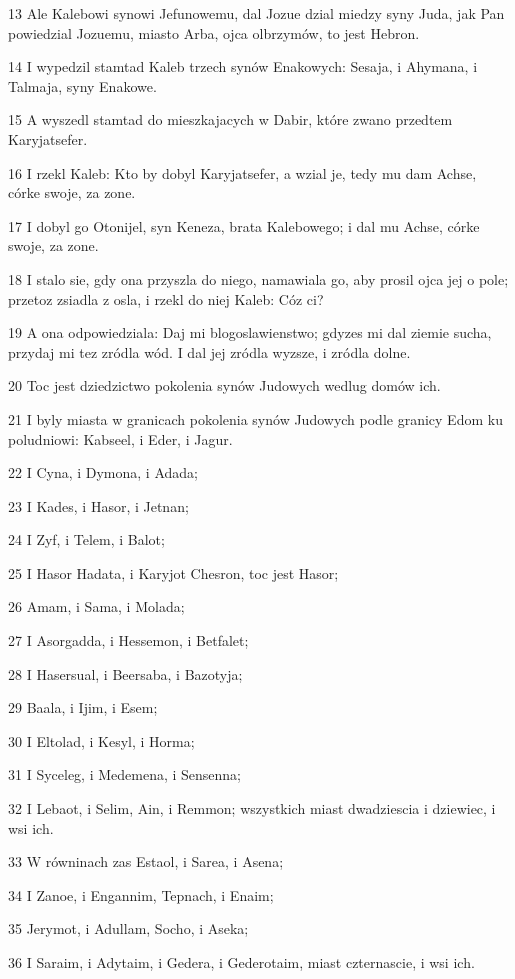 \par 13 Ale Kalebowi synowi Jefunowemu, dal Jozue dzial miedzy syny Juda, jak Pan powiedzial Jozuemu, miasto Arba, ojca olbrzymów, to jest Hebron.
\par 14 I wypedzil stamtad Kaleb trzech synów Enakowych: Sesaja, i Ahymana, i Talmaja, syny Enakowe.
\par 15 A wyszedl stamtad do mieszkajacych w Dabir, które zwano przedtem Karyjatsefer.
\par 16 I rzekl Kaleb: Kto by dobyl Karyjatsefer, a wzial je, tedy mu dam Achse, córke swoje, za zone.
\par 17 I dobyl go Otonijel, syn Keneza, brata Kalebowego; i dal mu Achse, córke swoje, za zone.
\par 18 I stalo sie, gdy ona przyszla do niego, namawiala go, aby prosil ojca jej o pole; przetoz zsiadla z osla, i rzekl do niej Kaleb: Cóz ci?
\par 19 A ona odpowiedziala: Daj mi blogoslawienstwo; gdyzes mi dal ziemie sucha, przydaj mi tez zródla wód. I dal jej zródla wyzsze, i zródla dolne.
\par 20 Toc jest dziedzictwo pokolenia synów Judowych wedlug domów ich.
\par 21 I byly miasta w granicach pokolenia synów Judowych podle granicy Edom ku poludniowi: Kabseel, i Eder, i Jagur.
\par 22 I Cyna, i Dymona, i Adada;
\par 23 I Kades, i Hasor, i Jetnan;
\par 24 I Zyf, i Telem, i Balot;
\par 25 I Hasor Hadata, i Karyjot Chesron, toc jest Hasor;
\par 26 Amam, i Sama, i Molada;
\par 27 I Asorgadda, i Hessemon, i Betfalet;
\par 28 I Hasersual, i Beersaba, i Bazotyja;
\par 29 Baala, i Ijim, i Esem;
\par 30 I Eltolad, i Kesyl, i Horma;
\par 31 I Syceleg, i Medemena, i Sensenna;
\par 32 I Lebaot, i Selim, Ain, i Remmon; wszystkich miast dwadziescia i dziewiec, i wsi ich.
\par 33 W równinach zas Estaol, i Sarea, i Asena;
\par 34 I Zanoe, i Engannim, Tepnach, i Enaim;
\par 35 Jerymot, i Adullam, Socho, i Aseka;
\par 36 I Saraim, i Adytaim, i Gedera, i Gederotaim, miast czternascie, i wsi ich.
